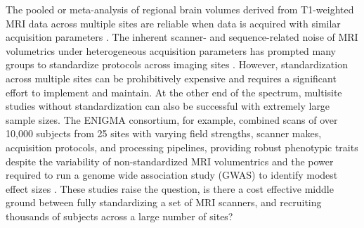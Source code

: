 The pooled  or meta-analysis of regional brain volumes derived from T1-weighted MRI data across multiple sites are reliable when data is acquired with similar acquisition parameters \cite{cannon2014,multicenter01,freesurferReliability}. The inherent scanner- and sequence-related noise of MRI volumetrics under heterogeneous acquisition parameters has prompted many groups to standardize protocols across imaging sites \cite{cannon2014,adniharmonize,ADNIReview}. However, standardization across multiple sites can be prohibitively expensive and requires a significant effort to implement and maintain. %
At the other end of the spectrum, multisite studies without standardization can also be successful with extremely large sample sizes. The ENIGMA consortium, for example, combined scans of over 10,000 subjects from 25 sites with varying field strengths, scanner makes, acquisition protocols, and processing pipelines, providing robust phenotypic traits despite the variability of non-standardized MRI volumentrics and the power required to run a genome wide association study (GWAS) to identify modest effect sizes \cite{thompson2014enigma}. These studies raise the question, is there a cost effective middle ground between fully standardizing a set of MRI scanners, and recruiting thousands of subjects across a large number of sites? %